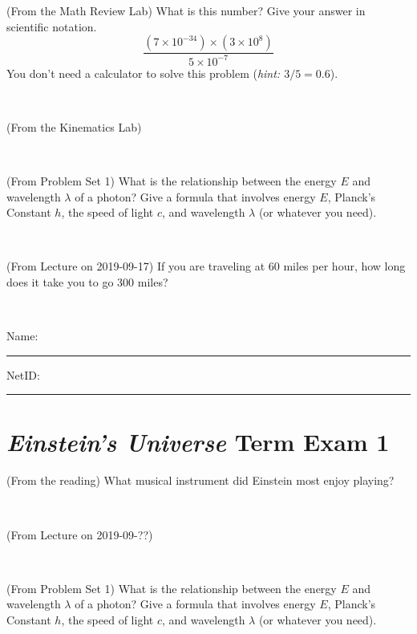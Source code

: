 \documentclass[12pt, letterpaper]{article}
\begin{document}
\clearpage


\begin{problem} (From the Math Review Lab)
What is this number? Give your answer in scientific notation.
$$
\frac{(7\times10^{-34})\times(3\times10^8)}{5\times10^{-7}}
$$
You don't need a calculator to solve this problem (\textit{hint: $3/5=0.6$}).
\end{problem}


\vfill ~

\begin{problem} (From the Kinematics Lab)

\end{problem}


\vfill ~

\begin{problem} (From Problem Set 1)
What is the relationship between the energy $E$ and wavelength
$\lambda$ of a photon? Give a formula that involves energy $E$,
Planck's Constant $h$, the speed of light $c$, and wavelength
$\lambda$ (or whatever you need).
\end{problem}

\vfill ~

\begin{problem} (From Lecture on 2019-09-17)
If you are traveling at 60 miles per hour, how long does
it take you to go 300 miles?
\end{problem}


\vfill ~


\cleardoublepage



\noindent
Name: \rule[-1ex]{0.60\textwidth}{0.1pt}
NetID: \rule[-1ex]{0.20\textwidth}{0.1pt}

\section*{\textsl{Einstein's Universe} Term Exam 1}
\setcounter{problem}{1}


\begin{problem} (From the reading)
What musical instrument did Einstein most enjoy playing?
\end{problem}


\vfill ~

\begin{problem} (From Lecture on 2019-09-??)
\end{problem}


\vfill ~

\begin{problem} (From Problem Set 1)
What is the relationship between the energy $E$ and wavelength
$\lambda$ of a photon? Give a formula that involves energy $E$,
Planck's Constant $h$, the speed of light $c$, and wavelength
$\lambda$ (or whatever you need).
\end{problem}
\end{document}
